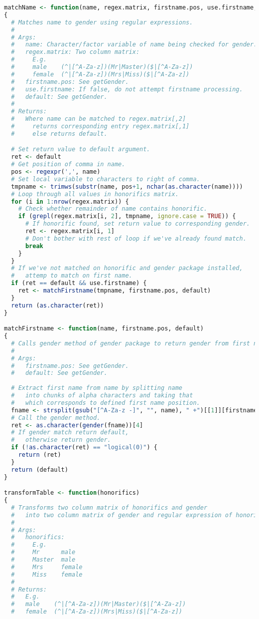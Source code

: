 \documentclass[a4paper, 11pt]{article}
\begin{document}
\begin{appendices}
\begin{lstlisting}[basicstyle=\small,language=R,showstringspaces=false]
matchName <- function(name, regex.matrix, firstname.pos, use.firstname, default)
{
  # Matches name to gender using regular expressions.
  #
  # Args:
  #   name: Character/factor variable of name being checked for gender.
  #   regex.matrix: Two column matrix: 
  #     E.g.
  #     male    (^|[^A-Za-z])(Mr|Master)($|[^A-Za-z])
  #     female  (^|[^A-Za-z])(Mrs|Miss)($|[^A-Za-z])
  #   firstname.pos: See getGender.
  #   use.firstname: If false, do not attempt firstname processing.
  #   default: See getGender.
  #
  # Returns:
  #   Where name can be matched to regex.matrix[,2] 
  #     returns corresponding entry regex.matrix[,1]
  #     else returns default.

  # Set return value to default argument.
  ret <- default
  # Get position of comma in name.
  pos <- regexpr(',', name)
  # Set local variable to characters to right of comma.
  tmpname <- trimws(substr(name, pos+1, nchar(as.character(name))))
  # Loop through all values in honorifics matrix.               
  for (i in 1:nrow(regex.matrix)) {
    # Check whether remainder of name contains honorific.
    if (grepl(regex.matrix[i, 2], tmpname, ignore.case = TRUE)) {
      # If honorific found, set return value to corresponding gender.
      ret <- regex.matrix[i, 1]
      # Don't bother with rest of loop if we've already found match.
      break
    }
  }
  # If we've not matched on honorific and gender package installed,
  #   attemp to match on first name.
  if (ret == default && use.firstname) {
    ret <- matchFirstname(tmpname, firstname.pos, default)
  }
  return (as.character(ret))
}

matchFirstname <- function(name, firstname.pos, default) 
{
  # Calls gender method of gender package to return gender from first name.
  #
  # Args:
  #   firstname.pos: See getGender.
  #   default: See getGender.
  
  # Extract first name from name by splitting name 
  #   into chunks of alpha characters and taking that
  #   which corresponds to defined first name position.
  fname <- strsplit(gsub("[^A-Za-z -]", "", name), " +")[[1]][firstname.pos]
  # Call the gender method.
  ret <- as.character(gender(fname))[4]
  # If gender match return default,
  #   otherwise return gender.
  if (!as.character(ret) == "logical(0)") {
    return (ret)
  }
  return (default)
}

transformTable <- function(honorifics) 
{
  # Transforms two column matrix of honorifics and gender
  #   into two column matrix of gender and regular expression of honorifics:
  #
  # Args:
  #   honorifics: 
  #     E.g.
  #     Mr      male
  #     Master  male
  #     Mrs     female
  #     Miss    female
  #
  # Returns:
  #   E.g.
  #   male    (^|[^A-Za-z])(Mr|Master)($|[^A-Za-z])
  #   female  (^|[^A-Za-z])(Mrs|Miss)($|[^A-Za-z])
  

\end{lstlisting}
\end{appendices}
\end{document}
